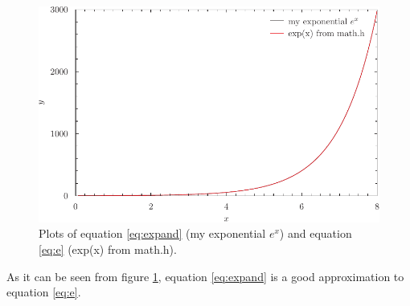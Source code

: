 \documentclass{article}
\begin{document}
\begin{figure}
\centering
\includegraphics{fig.pdf}
\caption{Plots of equation \ref{eq:expand} (my exponential $e^x$) and equation \ref{eq:e} (exp(x) from math.h).}
\label{fig:exp}
\end{figure}

As it can be seen from figure \ref{fig:exp}, equation \ref{eq:expand} is a good approximation to equation \ref{eq:e}.
\end{document}

